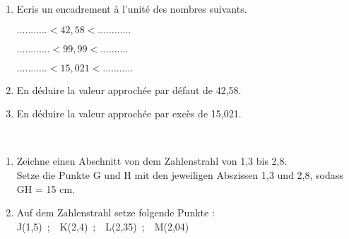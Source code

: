 \documentclass[10pt,openany]{book}
\begin{document}
\begin{enumerate}
\item Ecris un encadrement \`a l'unit\'e des nombres suivants.
\begin{multicols}{3}
\setlength{\columnseprule}{0pt}
$...........<42,58<............$

\columnbreak

$............<99,99<..........$

\columnbreak

$...........<15,021<...........$

\end{multicols}
\item En d\'eduire la valeur approch\'ee par d\'efaut de 42,58.
\vspace{1cm}
\item En d\'eduire la valeur approch\'ee par exc\`es de 15,021.
\end{enumerate}
\\
\begin{enumerate}
\item Zeichne einen Abschnitt von dem Zahlenstrahl von 1,3 bis 2,8.\\
Setze die Punkte G und H mit den jeweiligen Abszissen 1,3 und 2,8, sodass GH = 15 cm.    
\item Auf dem Zahlenstrahl setze folgende Punkte : \\
J(1,5)~;~~K(2,4)~;~~L(2,35)~;~~M(2,04)
\end{enumerate}
\end{document}
